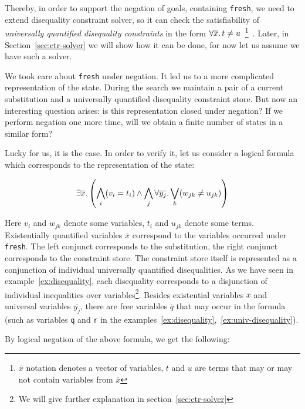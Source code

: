 Thereby, in order to support the negation of goals,
containing \lstinline{fresh},
we need to extend disequality constraint solver,
so it can check the satisfiability of 
\emph{universally quantified disequality constraints}
in the form $\forall \overline{x}\ldotp t \neq u$~\footnote{
$\overline{x}$ notation denotes a vector of variables,
$t$ and $u$ are terms that may or may not contain variables from $\overline{x}$
}~\cite{chan1988constructive, stuckey1991constructive}. 
Later, in Section~\ref{sec:ctr-solver} we will 
show how it can be done, for now let us assume we have such a solver. 

We took care about \lstinline{fresh} under negation.
It led us to a more complicated representation of the state. 
During the search we maintain a pair of a current substitution and 
a universally quantified disequality constraint store.
But now an interesting question arises: 
is this representation closed under negation? 
If we perform negation one more time, 
will we obtain a finite number of states in a similar form? 

Lucky for us, it is the case. In order to verify it, let us consider
a logical formula which corresponds to the representation of the state:

\begin{equation}
  \label{eq:state-positive}
  \exists\overline{x}\ldotp \left(
  \bigwedge_{i}(v_i = t_i) \wedge
  \bigwedge_{j}\forall\overline{y_j}\ldotp
  \bigvee_{k}(w_{jk} \neq u_{jk})
  \right)
\end{equation}

Here $v_i$ and $w_{jk}$ denote some variables,
$t_i$ and $u_{jk}$ denote some terms.
Existentially quantified variables $\overline{x}$
correspond to the variables occurred under \lstinline{fresh}.
The left conjunct corresponds to the substitution,
the right conjunct corresponds to the constraint store.
The constraint store itself is represented as a conjunction
of individual universally quantified disequalities.
As we have seen in example~\ref{ex:disequality},
each disequality corresponds to a disjunction
of individual inequalities over variables\footnote{
We will give further explanation in section~\ref{sec:ctr-solver}}.
Besides existential variables $\overline{x}$ 
and universal variables $\overline{y_j}$,
there are free variables $\overline{q}$ that may occur in the formula
(such as variables \lstinline{q} and \lstinline{r} in 
the examples~\ref{ex:disequality},~\ref{ex:univ-disequality}).

By logical negation of the above formula, we get the following:

